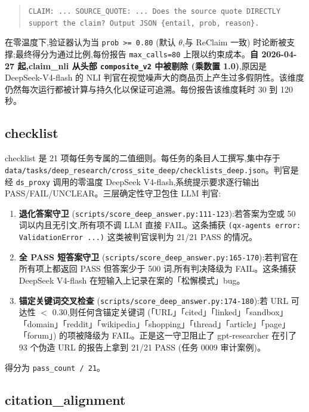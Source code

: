 \documentclass[UTF8,a4paper,12pt,oneside]{ctexart}
\begin{document}
\begin{quote}
\small \texttt{CLAIM: ... SOURCE\_QUOTE: ... Does the source quote DIRECTLY support the claim? Output JSON \{entail, prob, reason\}.}
\end{quote}

在零温度下,验证器认为当 \texttt{prob >= 0.80} (默认 \(\theta\),与 ReClaim \cite{reclaim} 一致) 时论断被支撑;最终得分为通过比例,每份报告 \texttt{max\_calls=80} 上限以约束成本。\textbf{自 2026-04-27 起,claim\_nli 从头部 \texttt{composite\_v2} 中被剔除 (乘数置 1.0)},原因是 DeepSeek-V4-flash 的 NLI 判官在视觉噪声大的商品页上产生过多假阴性。该维度仍然每次运行都被计算与持久化以保证可追溯。每份报告该维度耗时 30 到 120 秒。

\subsection{checklist}

checklist 是 21 项每任务专属的二值细则。每任务的条目人工撰写,集中存于 \texttt{data/tasks/deep\_research/cross\_site\_deep/checklists\_deep.json}。判官是经 \texttt{ds\_proxy} 调用的零温度 DeepSeek V4-flash,系统提示要求逐行输出 PASS/FAIL/UNCLEAR。三层确定性守卫包住 LLM 判官:

\begin{enumerate}[leftmargin=2em]
\item \textbf{退化答案守卫} (\texttt{scripts/score\_deep\_answer.py:111-123}):若答案为空或 50 词以内且无引文,所有项不调 LLM 直接 FAIL。这条捕获 \texttt{(qx-agents error: ValidationError ...)} 这类被判官误判为 21/21 PASS 的情况。
\item \textbf{全 PASS 短答案守卫} (\texttt{scripts/score\_deep\_answer.py:165-170}):若判官在所有项上都返回 PASS 但答案少于 500 词,所有判决降级为 FAIL。这条捕获 DeepSeek V4-flash 在短输入上记录在案的「松懈模式」bug。
\item \textbf{锚定关键词交叉检查} (\texttt{scripts/score\_deep\_answer.py:174-180}):若 URL 可达性 \(<\) 0.30,则任何含锚定关键词 (「URL」「cited」「linked」「sandbox」「domain」「reddit」「wikipedia」「shopping」「thread」「article」「page」「forum」) 的项被降级为 FAIL。正是这一守卫阻止了 gpt-researcher 在引了 93 个伪造 URL 的报告上拿到 21/21 PASS (任务 0009 审计案例)。
\end{enumerate}

得分为 \texttt{pass\_count / 21}。

\subsection{citation\_alignment}
\end{document}
